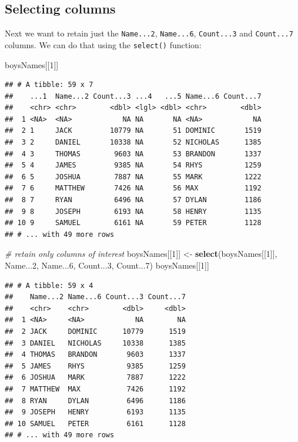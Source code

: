 \documentclass[
]{book}
\newenvironment{Shaded}{\begin{snugshade}}{\end{snugshade}}
\newcommand{\CommentTok}[1]{\textcolor[rgb]{0.56,0.35,0.01}{\textit{#1}}}
\newcommand{\DecValTok}[1]{\textcolor[rgb]{0.00,0.00,0.81}{#1}}
\newcommand{\KeywordTok}[1]{\textcolor[rgb]{0.13,0.29,0.53}{\textbf{#1}}}
\newcommand{\NormalTok}[1]{#1}
\newcommand{\StringTok}[1]{\textcolor[rgb]{0.31,0.60,0.02}{#1}}
\begin{document}
\hypertarget{selecting-columns}{%
\subsection{Selecting columns}\label{selecting-columns}}

Next we want to retain just the \texttt{Name...2}, \texttt{Name...6}, \texttt{Count...3} and \texttt{Count...7} columns. We can do that using the \texttt{select()} function:

\begin{Shaded}
\begin{Highlighting}[]
\NormalTok{boysNames[[}\DecValTok{1}\NormalTok{]]}
\end{Highlighting}
\end{Shaded}

\begin{verbatim}
## # A tibble: 59 x 7
##    ...1  Name...2 Count...3 ...4   ...5 Name...6 Count...7
##    <chr> <chr>        <dbl> <lgl> <dbl> <chr>        <dbl>
##  1 <NA>  <NA>            NA NA       NA <NA>            NA
##  2 1     JACK         10779 NA       51 DOMINIC       1519
##  3 2     DANIEL       10338 NA       52 NICHOLAS      1385
##  4 3     THOMAS        9603 NA       53 BRANDON       1337
##  5 4     JAMES         9385 NA       54 RHYS          1259
##  6 5     JOSHUA        7887 NA       55 MARK          1222
##  7 6     MATTHEW       7426 NA       56 MAX           1192
##  8 7     RYAN          6496 NA       57 DYLAN         1186
##  9 8     JOSEPH        6193 NA       58 HENRY         1135
## 10 9     SAMUEL        6161 NA       59 PETER         1128
## # ... with 49 more rows
\end{verbatim}

\begin{Shaded}
\begin{Highlighting}[]
\CommentTok{\# retain only columns of interest}
\NormalTok{boysNames[[}\DecValTok{1}\NormalTok{]] \textless{}{-}}\StringTok{ }\KeywordTok{select}\NormalTok{(boysNames[[}\DecValTok{1}\NormalTok{]], Name...}\DecValTok{2}\NormalTok{, Name...}\DecValTok{6}\NormalTok{, Count...}\DecValTok{3}\NormalTok{, Count...}\DecValTok{7}\NormalTok{)}
\NormalTok{boysNames[[}\DecValTok{1}\NormalTok{]]}
\end{Highlighting}
\end{Shaded}

\begin{verbatim}
## # A tibble: 59 x 4
##    Name...2 Name...6 Count...3 Count...7
##    <chr>    <chr>        <dbl>     <dbl>
##  1 <NA>     <NA>            NA        NA
##  2 JACK     DOMINIC      10779      1519
##  3 DANIEL   NICHOLAS     10338      1385
##  4 THOMAS   BRANDON       9603      1337
##  5 JAMES    RHYS          9385      1259
##  6 JOSHUA   MARK          7887      1222
##  7 MATTHEW  MAX           7426      1192
##  8 RYAN     DYLAN         6496      1186
##  9 JOSEPH   HENRY         6193      1135
## 10 SAMUEL   PETER         6161      1128
## # ... with 49 more rows
\end{verbatim}
\end{document}
